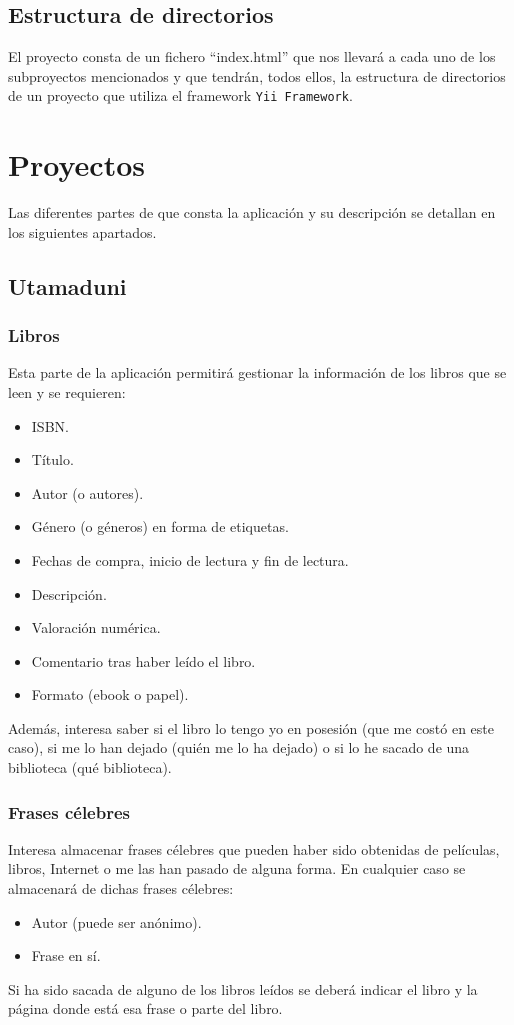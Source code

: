 \documentclass[12pt,twoside,a4paper]{article}
\begin{document}
\subsection{Estructura de directorios}
El proyecto consta de un fichero ``index.html'' que nos llevará a cada uno de los subproyectos mencionados y que tendrán, todos ellos, la estructura de directorios de un proyecto que utiliza el framework \texttt{Yii Framework}.

\section{Proyectos}
Las diferentes partes de que consta la aplicación y su descripción se detallan en los siguientes apartados.

\subsection{Utamaduni}
\subsubsection{Libros}
Esta parte de la aplicación permitirá gestionar la información de los libros que se leen y se requieren:
\begin{itemize}
\item ISBN.
\item Título.
\item Autor (o autores).
\item Género (o géneros) en forma de etiquetas.
\item Fechas de compra, inicio de lectura y fin de lectura.
\item Descripción.
\item Valoración numérica.
\item Comentario tras haber leído el libro.
\item Formato (ebook o papel).
\end{itemize}
Además, interesa saber si el libro lo tengo yo en posesión (que me costó en este caso), si me lo han dejado (quién me lo ha dejado) o si lo he sacado de una biblioteca (qué biblioteca).

\subsubsection{Frases célebres}
Interesa almacenar frases célebres que pueden haber sido obtenidas de películas, libros, Internet o me las han pasado de alguna forma. En cualquier caso se almacenará de dichas frases célebres:
\begin{itemize}
\item Autor (puede ser anónimo).
\item Frase en sí.
\end{itemize}
Si ha sido sacada de alguno de los libros leídos se deberá indicar el libro y la página donde está esa frase o parte del libro.
\end{document}
